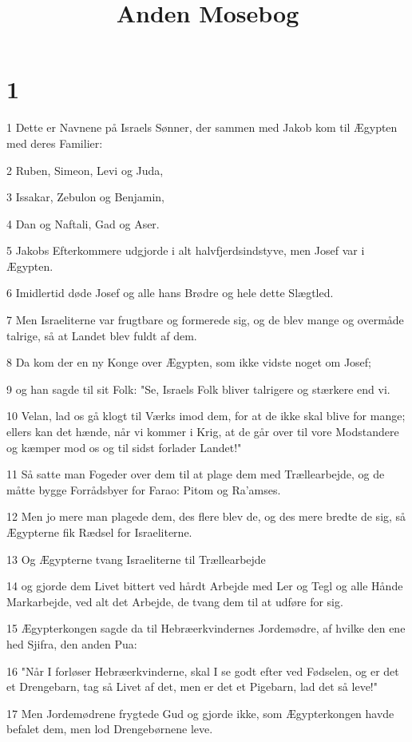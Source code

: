 

\title{Anden Mosebog}


\chapter{1}

\par 1 Dette er Navnene på Israels Sønner, der sammen med Jakob kom til Ægypten med deres Familier:
\par 2 Ruben, Simeon, Levi og Juda,
\par 3 Issakar, Zebulon og Benjamin,
\par 4 Dan og Naftali, Gad og Aser.
\par 5 Jakobs Efterkommere udgjorde i alt halvfjerdsindstyve, men Josef var i Ægypten.
\par 6 Imidlertid døde Josef og alle hans Brødre og hele dette Slægtled.
\par 7 Men Israeliterne var frugtbare og formerede sig, og de blev mange og overmåde talrige, så at Landet blev fuldt af dem.
\par 8 Da kom der en ny Konge over Ægypten, som ikke vidste noget om Josef;
\par 9 og han sagde til sit Folk: "Se, Israels Folk bliver talrigere og stærkere end vi.
\par 10 Velan, lad os gå klogt til Værks imod dem, for at de ikke skal blive for mange; ellers kan det hænde, når vi kommer i Krig, at de går over til vore Modstandere og kæmper mod os og til sidst forlader Landet!"
\par 11 Så satte man Fogeder over dem til at plage dem med Trællearbejde, og de måtte bygge Forrådsbyer for Farao: Pitom og Ra'amses.
\par 12 Men jo mere man plagede dem, des flere blev de, og des mere bredte de sig, så Ægypterne fik Rædsel for Israeliterne.
\par 13 Og Ægypterne tvang Israeliterne til Trællearbejde
\par 14 og gjorde dem Livet bittert ved hårdt Arbejde med Ler og Tegl og alle Hånde Markarbejde, ved alt det Arbejde, de tvang dem til at udføre for sig.
\par 15 Ægypterkongen sagde da til Hebræerkvindernes Jordemødre, af hvilke den ene hed Sjifra, den anden Pua:
\par 16 "Når I forløser Hebræerkvinderne, skal I se godt efter ved Fødselen, og er det et Drengebarn, tag så Livet af det, men er det et Pigebarn, lad det så leve!"
\par 17 Men Jordemødrene frygtede Gud og gjorde ikke, som Ægypterkongen havde befalet dem, men lod Drengebørnene leve.
